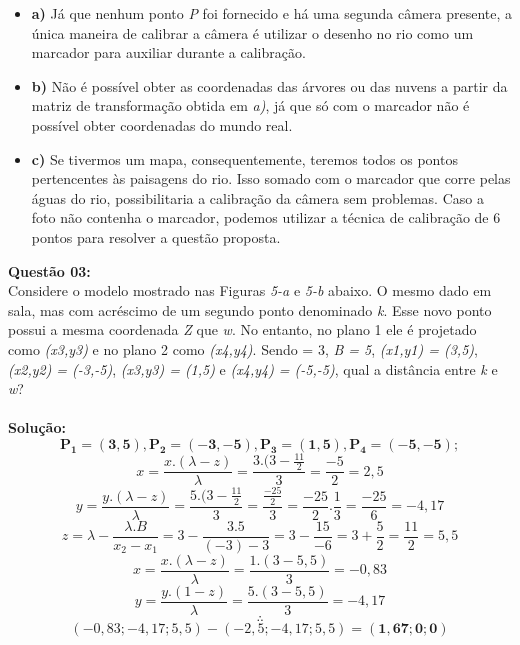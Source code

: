\begin{itemize}
\item\textbf{a)}
Já que nenhum ponto \emph{P} foi fornecido e há uma segunda câmera presente, a única maneira de calibrar a câmera é utilizar o desenho no rio como um marcador para auxiliar durante a calibração.

\vspace{0.5cm}
\item\textbf{b)}
Não é possível obter as coordenadas das árvores ou das nuvens a partir da matriz de transformação obtida em \emph{a)}, já que só com o marcador não é possível obter coordenadas do mundo real.

\vspace{0.5cm}
\item\textbf{c)}
Se tivermos um mapa, consequentemente, teremos todos os pontos pertencentes às paisagens do rio. Isso somado com o marcador que corre pelas águas do rio, possibilitaria a calibração da câmera sem problemas. Caso a foto não contenha o marcador, podemos utilizar a técnica de calibração de 6 pontos para resolver a questão proposta.
\end{itemize}

\vspace{0.5 cm}
\noindent\textbf{Questão 03:}\\
Considere o modelo mostrado nas Figuras \emph{5-a} e \emph{5-b} abaixo. O mesmo dado em sala, mas com acréscimo de um segundo ponto denominado \emph{k}. Esse novo ponto possui a mesma coordenada \emph{Z} que \emph{w}. No entanto, no plano 1 ele é projetado como \emph{(x3,y3)} e no plano 2 como \emph{(x4,y4)}. Sendo \textlambda = 3, \emph{B = 5}, \emph{(x1,y1) = (3,5)}, \emph{(x2,y2) = (-3,-5)}, \emph{(x3,y3) = (1,5)} e \emph{(x4,y4) = (-5,-5)}, qual a distância entre \emph{k} e \emph{w}?\\
\\
\noindent\textbf{Solução:}
\[ \mathbf{P_{1} = (3,5), P_{2} = (-3, -5), P_{3} = (1,5), P_{4} = (-5, -5)}; \]
\vspace{0.2 cm}
\[ x = \frac{x.(\lambda - z)}{\lambda} = \frac{3.(3 - \frac{11}{2}}{3} = \frac{-5}{2} = 2,5 \]
\[ y = \frac{y.(\lambda - z)}{\lambda} = \frac{5.(3-\frac{11}{2}}{3} = \frac{\frac{-25}{2}}{3} = \frac{-25}{2} . \frac{1}{3} = \frac{-25}{6} = -4,17 \]
\[ z = \lambda - \frac{\lambda . B}{x_{2}-x_{1}} = 3 - \frac{3.5}{(-3)-3} = 3 - \frac{15}{-6} = 3 + \frac{5}{2} = \frac{11}{2} = 5,5 \]
\[ x = \frac{x.(\lambda - z)}{\lambda} = \frac{1.(3 - 5,5)}{3} = -0,83 \]
\[ y = \frac{y.(1-z)}{\lambda} = \frac{5.(3 - 5,5)}{3} = -4,17 \]
\[ \therefore \]
\[(-0,83; -4,17; 5,5) - (-2,5; -4,17; 5,5) = \mathbf{(1,67; 0; 0)} \]

